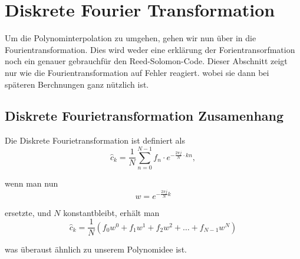 %
%
%
\section{Diskrete Fourier Transformation
\label{reedsolomon:section:dtf}}
Um die Polynominterpolation zu umgehen, gehen wir nun über in die Fourientransformation.
Dies wird weder eine erklärung der Forientransorfmation noch ein genauer gebrauchfür den Reed-Solomon-Code. 
Dieser Abschnitt zeigt nur wie die Fourientransformation auf Fehler reagiert.
wobei sie dann bei späteren Berchnungen ganz nützlich ist.

\subsection{Diskrete Fourietransformation Zusamenhang
\label{reedsolomon:subsection:dtfzusamenhang}}
Die Diskrete Fourietransformation ist definiert als
\begin{equation}
	\hat{c}_{k} 
	= \frac{1}{N} \sum_{n=0}^{N-1}
	{f}_n \cdot e^{-\frac{2\pi j}{N} \cdot kn}
	,\label{reedsolomon:DFT}
\end{equation}

wenn man nun 
\begin{equation}
	w =
	e^{-\frac{2\pi j}{N} k}
	\label{reedsolomon:DFT_summand}
\end{equation}

ersetzte, und $N$ konstantbleibt, erhält man
\begin{equation}
	\hat{c}_{k}=
	\frac{1}{N}( {f}_0 w^0 + {f}_1 w^1 + {f}_2 w^2 + \dots + {f}_{N-1} w^N)
	\label{reedsolomon:DFT_polynom}
\end{equation}

was überaust ähnlich zu unserem Polynomidee ist.
